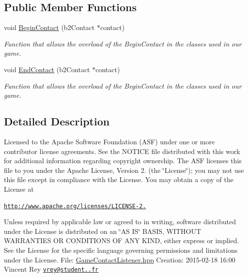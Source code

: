 \subsection*{Public Member Functions}
\begin{DoxyCompactItemize}
\item 
void \hyperlink{class_game_contact_listener_a3a66eddc0010a96f83a0cb61d3835cc7}{Begin\-Contact} (b2\-Contact $\ast$contact)
\begin{DoxyCompactList}\small\item\em Function that allows the overload of the Begin\-Contact in the classes used in our game. \end{DoxyCompactList}\item 
void \hyperlink{class_game_contact_listener_a2d754e57a4f6c88541853a506ec3b10d}{End\-Contact} (b2\-Contact $\ast$contact)
\begin{DoxyCompactList}\small\item\em Function that allows the overload of the Begin\-Contact in the classes used in our game. \end{DoxyCompactList}\end{DoxyCompactItemize}


\subsection{Detailed Description}
Licensed to the Apache Software Foundation (A\-S\-F) under one or more contributor license agreements. See the N\-O\-T\-I\-C\-E file distributed with this work for additional information regarding copyright ownership. The A\-S\-F licenses this file to you under the Apache License, Version 2. (the \char`\"{}\-License\char`\"{}); you may not use this file except in compliance with the License. You may obtain a copy of the License at

\href{http://www.apache.org/licenses/LICENSE-2.0}{\tt http\-://www.\-apache.\-org/licenses/\-L\-I\-C\-E\-N\-S\-E-\/2.}

Unless required by applicable law or agreed to in writing, software distributed under the License is distributed on an \char`\"{}\-A\-S I\-S\char`\"{} B\-A\-S\-I\-S, W\-I\-T\-H\-O\-U\-T W\-A\-R\-R\-A\-N\-T\-I\-E\-S O\-R C\-O\-N\-D\-I\-T\-I\-O\-N\-S O\-F A\-N\-Y K\-I\-N\-D, either express or implied. See the License for the specific language governing permissions and limitations under the License. File\-: \hyperlink{_game_contact_listener_8hpp_source}{Game\-Contact\-Listener.\-hpp} Creation\-: 2015-\/02-\/18 16\-:00 Vincent Rey \href{mailto:vrey@student.42.fr}{\tt vrey@student..\-fr} 

